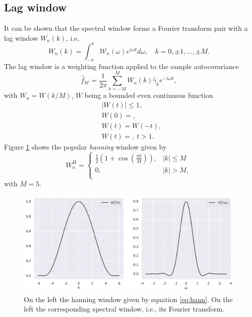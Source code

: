\documentclass[a4paper, 10pt]{memoir}
\theoremstyle{plain}
\theoremstyle{definition}
\theoremstyle{remark}
\begin{document}
\subsection{Lag window}
It can be shown \cite{wei} that the spectral window forms a Fourier transform pair with a lag window $W_n(k)$, i.e,
\begin{equation*}
        W_n(k) = \int_{-\pi}^{\pi}\mathcal{W}_n(\omega) e^{i\omega k}d\omega, \quad k = 0, \pm 1, \hdots, \pm M.
\end{equation*}
The lag window is a weighting function applied to the sample autocovariance 
\begin{equation*}
        \hat{f}_\mathcal{W} = \frac{1}{2\pi} \sum_{k = -M}^{M}W_n(k) \hat{\gamma}_k e^{-i\omega k},
\end{equation*}
with $W_n = W(k/M)$, $W$ being a bounded even continuous function 
\begin{align*}
        &|W(t)| \leq 1, \\
        &W(0) =, \\
        &W(t) = W(-t), \\
        &W(t) = , \  t > 1.
\end{align*}
Figure \ref{fig:windows} shows the popular \textit{hanning} window given by 
\begin{equation}\label{eq:hann}
        W_n^H=
                \begin{cases}
                      \frac{1}{2}(1 + \cos(\frac{\pi k}{M})),   & |k| \leq M \\
                       0,  & |k| > M, \\
                \end{cases}
\end{equation}
with $M = 5$.


\begin{figure}[tb ]
        \centering
        \includegraphics[width=\linewidth]{./code/figures/windows.pdf}
        \caption{On the left the hanning window given by equation \eqref{eq:hann}.
        On the left the corresponding spectral window, i.e., its Fourier transform.}
        \label{fig:windows}
\end{figure}
\end{document}
